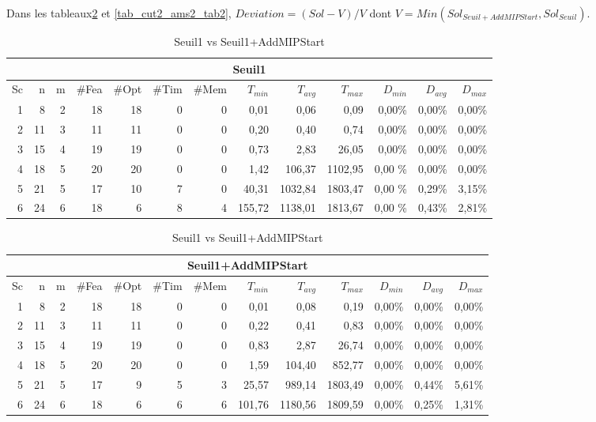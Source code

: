 Dans les tableaux\ref{tab_cut2_ams1_tab2} et \ref{tab_cut2_ams2_tab2}, $Deviation = (Sol-V)/V$ dont $V =Min(Sol_{Seuil+AddMIPStart},Sol_{Seuil})$.

\begin{table}[h]
    \centering
    \begin{tabular}{|r|r|r|r|r|r|r|r|r|r|r|r|r|}
    	\hline
    	\multicolumn{13}{|c|}{Seuil1}\\ \hline
Sc &	n	&m	&\#Fea	&\#Opt	&\#Tim &\#Mem	&$T_{min}$ & $T_{avg}$	& $T_{max}$ & $D_{min}$ & $D_{avg}$	& $D_{max}$ \\ \hline
1&	8 &	2&	18&	18&	0&	0&	0,01&	0,06&	0,09	&0,00\%&	0,00\%&	0,00\%    \\ \hline
2&	11&	3&	11&	11&	0&	0&	0,20&	0,40&	0,74	&0,00\%&	0,00\%&	0,00\%     \\ \hline
3&	15&	4&	19&	19&	0&	0&	0,73&	2,83&	26,05	&0,00\%&	0,00\%&	0,00\%  \\ \hline
4 &	18	&5	&20	    &20	&0	&0	&1,42	&106,37	&1102,95	&0,00	\%&0,00\%&	0,00\% \\ \hline
5 &	21	&5	&17	    &10	&7	&0	&40,31	&1032,84&	1803,47	&0,00	\%&0,29\%&	3,15\% \\ \hline
6 &	24	&6	&18	    &6	&8	&4	&155,72	&1138,01&	1813,67	&0,00	\%&0,43\%&	2,81\% \\ \hline
    \end{tabular}
\medskip \par
    \begin{tabular}{|r|r|r|r|r|r|r|r|r|r|r|r|r|}
    	\hline
    	\multicolumn{13}{|c|}{Seuil1+AddMIPStart}\\ \hline
Sc &	n	&m	&\#Fea	&\#Opt	&\#Tim &\#Mem	&$T_{min}$ & $T_{avg}$	& $T_{max}$ & $D_{min}$ & $D_{avg}$	& $D_{max}$ \\ \hline
1&	8 &	2&	18&	18&	0&	0&	0,01&	0,08&	0,19	&0,00\%&	0,00\%&	0,00\%    \\ \hline
2&	11&	3&	11&	11&	0&	0&	0,22&	0,41&	0,83	&0,00\%&	0,00\%&	0,00\%     \\ \hline
3&	15&	4&	19&	19&	0&	0&	0,83&	2,87&	26,74	&0,00\%&	0,00\%&	0,00\%  \\ \hline
4 &	18	&5	&20	  &20	&0	&0	&1,59	&104,40	&852,77	    &0,00\%&	0,00\%&	0,00\% \\ \hline
5 &	21	&5	&17	  &9	&5	&3	&25,57	&989,14	&1803,49	&0,00\%&	0,44\%&	5,61\% \\ \hline
6 &	24	&6	&18	  &6	&6	&6	&101,76	&1180,56&	1809,59	&0,00\%&	0,25\%&	1,31\% \\ \hline

    \end{tabular}
    \caption{Seuil1 vs Seuil1+AddMIPStart}
    \label{tab_cut2_ams1_tab2}
\end{table}


